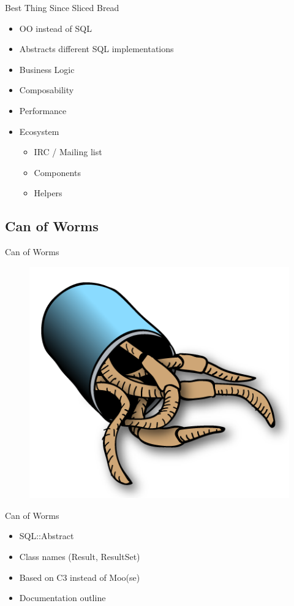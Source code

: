 \begin{frame}{Best Thing Since Sliced Bread}
\begin{itemize}
\item OO instead of SQL
\item Abstracts different SQL implementations
\item Business Logic
\item Composability
\item Performance
\item Ecosystem
\begin{itemize}
\item IRC / Mailing list
\item Components
\item Helpers
\end{itemize}
\end{itemize}
\end{frame}

\subsection{Can of Worms}

\begin{frame}{Can of Worms}
\begin{figure}[!ht]
\centering
\includegraphics[width=0.75\linewidth]{img/canofworms.png}
\end{figure}
\end{frame}

\begin{frame}{Can of Worms}
\begin{itemize}
\item SQL::Abstract
\item Class names (Result, ResultSet)
\item Based on C3 instead of Moo(se)
\item Documentation outline
\end{itemize}
\end{frame}


